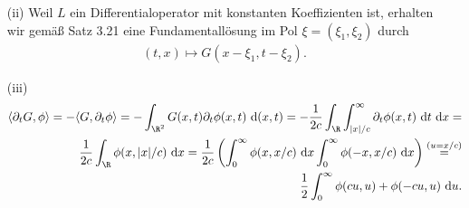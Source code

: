 \begin{solution}
\begin{itemize}
\item[(ii)] Weil $L$ ein Differentialoperator mit konstanten Koeffizienten ist, erhalten wir gemäß Satz 3.21 eine Fundamentallösung im Pol $\xi = (\xi_1, \xi_2)$ durch
\begin{align*}
(t, x) \mapsto G(x - \xi_1, t - \xi_2).
\end{align*}

\item[(iii)]
\begin{align*}
    \langle \partial_t G, \phi \rangle = - \langle G, \partial_t \phi \rangle =
    - \int_{\R^2} G(x, t) \partial_t \phi(x, t) \mathrm{~d}(x, t) =
    - \frac{1}{2c} \int_\R \int_{|x|/c}^\infty \partial_t \phi(x, t)    \mathrm{~d}t \mathrm{~d}x = \\
    \frac{1}{2c} \int_\R \phi(x, |x|/c) \mathrm{~d}x =
    \frac{1}{2c} \left( \int_0^\infty \phi(x, x/c) \mathrm{~d}x \int_0^\infty \phi(-x, x/c) \mathrm{~d}x \right) \stackrel{(u = x/c)}{~=~} \\
    \frac{1}{2} \int_0^\infty \phi(cu, u) + \phi(-cu, u) \mathrm{~d}u.
\end{align*}

\end{itemize}

\end{solution}


